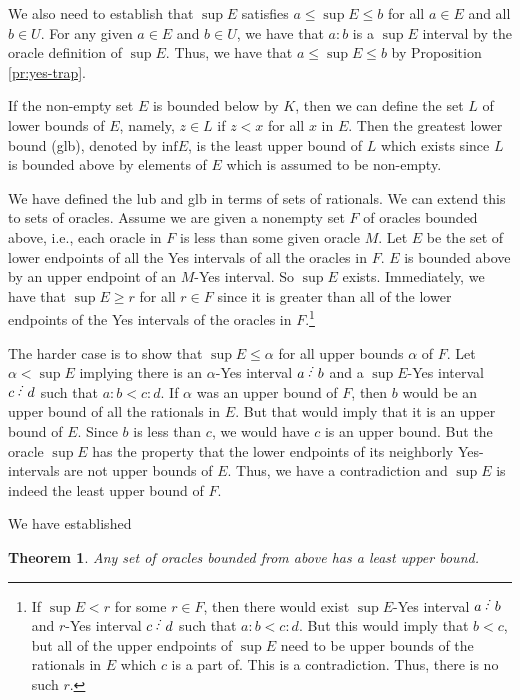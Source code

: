 \documentclass[12pt]{article}
\newtheorem{theorem}{Theorem}[subsection]
\begin{document}
We also need to establish that $\sup E$ satisfies $a \leq \sup E \leq b$ for all $a \in E$ and all $b \in U$. For any given $a \in E$ and $b \in U$, we have that $a:b$ is a $\sup E$ interval by the oracle definition of $\sup E$. Thus, we have that $a \leq \sup E \leq b$ by Proposition \ref{pr:yes-trap}. 

If the non-empty set $E$ is bounded below by $K$, then we can define the set $L$ of lower bounds of $E$, namely, $z \in L$ if $z < x$ for all $x$ in $E$. Then the greatest lower bound (glb), denoted by $\mathrm{inf} E$, is the least upper bound of $L$ which exists since $L$ is bounded above by elements of $E$ which is assumed to be non-empty. 

We have defined the lub and glb in terms of sets of rationals. We can extend this to sets of oracles. Assume we are given a nonempty set $F$ of oracles bounded above, i.e., each oracle in $F$ is less than some given oracle $M$. Let $E$ be the set of lower endpoints of all the Yes intervals of all the oracles in $F$. $E$ is bounded above by an upper endpoint of an $M$-Yes interval. So $\sup E$ exists. Immediately, we have that $\sup E \geq r$ for all $r \in F$ since it is greater than all of the lower endpoints of the Yes intervals of the oracles in $F$.\footnote{If $\sup E < r$ for some $r \in F$, then there would exist $\sup E$-Yes interval $a \lte b$ and $r$-Yes interval $c\lte d$ such that $a:b < c:d$. But this would imply that $b < c$, but all of the upper endpoints of $\sup E$ need to be upper bounds of the rationals in $E$ which $c$ is a part of. This is a contradiction. Thus, there is no such $r$.}

The harder case is to show that $\sup E \leq \alpha$ for all upper bounds $\alpha$ of $F$. Let $\alpha < \sup E$ implying there is an $\alpha$-Yes interval $a\lte b$ and a $\sup E$-Yes interval $c\lte d$ such that $a:b < c:d$. If $\alpha$ was an upper bound of $F$, then $b$ would be an upper bound of all the rationals in $E$. But that would imply that it is an upper bound of $E$. Since $b$ is less than $c$, we would have $c$ is an upper bound. But the oracle $\sup E$ has the property that the lower endpoints of its neighborly Yes-intervals are not upper bounds of $E$. Thus, we have a contradiction and $\sup E$ is indeed the least upper bound of $F$.

We have established

\begin{theorem}\label{th:lub}
Any set of oracles bounded from above has a least upper bound. 
\end{theorem}
\end{document}
